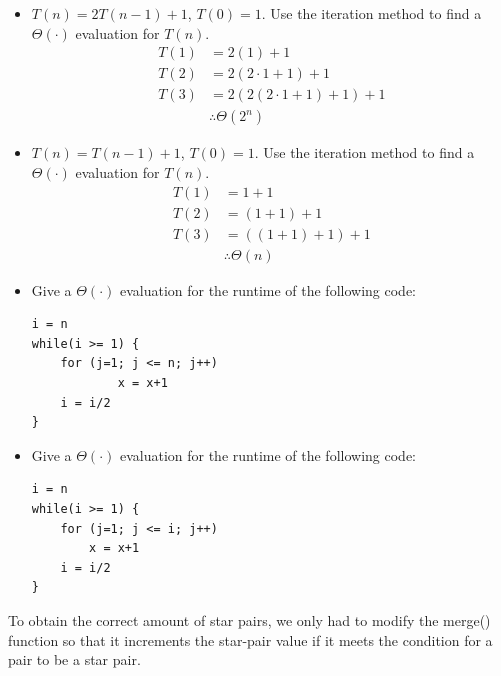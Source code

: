 \documentclass[11pt]{article}
\begin{document}
\begin{itemize}
	\item $T(n) = 2T(n-1) + 1$, $T(0)=1$.  Use the iteration method to find a $\Theta(\cdot)$ evaluation for $T(n)$.
	      \begin{align*}
		      T(1) & = 2(1) + 1                   \\
		      T(2) & = 2(2\cdot 1 + 1) + 1        \\
		      T(3) & = 2(2(2\cdot 1 + 1) + 1) + 1 \\
		           & \therefore \Theta{(2^{n})}
	      \end{align*}
	\item $T(n) = T(n-1) + 1$,  $T(0)=1$.  Use the iteration method to find a $\Theta(\cdot)$ evaluation for $T(n)$.
	      \begin{align*}
		      T(1) & = 1 + 1                \\
		      T(2) & = (1+1) + 1            \\
		      T(3) & = ((1+1)+1) + 1        \\
		           & \therefore \Theta{(n)}
	      \end{align*}
	\item Give a $\Theta(\cdot)$ evaluation for the runtime of the following code:

	      \begin{lstlisting}[numbers=none, keywordstyle=\bfseries, frame=none, title=\(\Theta{(n \log{n})}\)]
i = n
while(i >= 1) {
	for (j=1; j <= n; j++)
			x = x+1
	i = i/2
}
	\end{lstlisting}

	\item Give a $\Theta( \cdot)$ evaluation for the runtime of the following code:
	      \begin{lstlisting}[numbers=none, keywordstyle=\bfseries, frame=none, title={\(\Theta{(n \log{n})}\)}]
i = n
while(i >= 1) {
	for (j=1; j <= i; j++)
		x = x+1
	i = i/2
}
	\end{lstlisting}
\end{itemize} \par
\newpage
To obtain the correct amount of star pairs, we only had to modify the merge() function so that it increments the star-pair value if it meets the condition for a pair to be a star pair.
\end{document}
